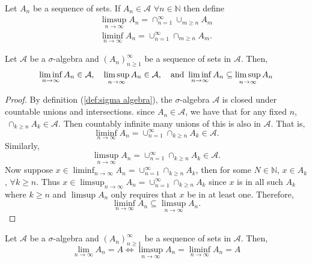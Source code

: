 \documentclass[../main.tex]{subfiles}
\begin{document}
\begin{definition}\label{def:sup and inf of sequence of sets}
Let $A_n$ be a sequence of sets. If $A_n \in \mathcal{A}$ $\forall n \in \mathbb{N}$ then define
\begin{gather*}
\limsup_{n\to\infty}{A_n} = \cap^\infty_{n=1}\cup_{m \geq n}{A_m}\\
\liminf_{n\to\infty}{A_n} = \cup^\infty_{n=1}\cap_{m\geq n}{A_m}.
\end{gather*}

\end{definition}


\begin{lemma}\label{lem:inf subset of sup}
Let $\mathcal{A}$ be a $\sigma$-algebra and $(A_n)^\infty_{n\geq 1}$ be a sequence 
of sets in $\mathcal{A}$. Then, \[
\liminf_{n\to\infty}{A_n} \in \mathcal{A}, \quad \limsup_{n\to\infty}{A_n} \in \mathcal{A}, \quad \textnormal{and } \liminf_{n\to\infty}{A_n} \subseteq \limsup_{n\to\infty}{A_n}
\]
\end{lemma}

\begin{proof}
By definition (\ref{def:sigma algebra}), the $\sigma$-algebra $\mathcal{A}$
is closed under countable unions and intersections. since $A_n \in \mathcal{A}$, we have that 
for any fixed $n$, $ \ \cap_{k\geq n}{A_k} \in \mathcal{A}$. Then
countably infinite many unions of this is also in $\mathcal{A}$. That is, \[
\liminf_{n\to\infty}{A_n} = \cup^\infty_{n=1}\cap_{k\geq n}{A_k} \in \mathcal{A}.
\]
Similarly, \[
    \limsup_{n\to\infty}{A_n} = \cup^\infty_{n=1}\cap_{k\geq n}{A_k} \in \mathcal{A}.
\]
Now suppose $x \in \liminf_{n\to\infty}{A_n} = \cup^\infty_{n=1}\cap_{k\geq n}{A_k}$, then for some
$N \in \mathbb{N}$, $x \in A_k$, $\forall k \geq n$. Thus $x \in \limsup_{n\to\infty}{A_n} = \cup^\infty_{n=1}\cap_{k\geq n}{A_k}$ since
$x$ is in all such $A_k$ where $k \geq n$ and $\limsup{A_n}$ only requires that $x$ be in at least one. Therefore,
\[
\liminf_{n\to\infty}{A_n} \subseteq \limsup_{n\to\infty}{A_n}.
\]
\end{proof}




\begin{lemma}\label{lem:sup equal inf mean converge}
Let $\mathcal{A}$ be a $\sigma$-algebra and $(A_n)^\infty_{n\geq 1}$ be a sequence 
of sets in $\mathcal{A}$. Then, \[
\lim_{n\to\infty}{A_n}=A \iff \limsup_{n\to\infty}{A_n} = \liminf_{n\to\infty}{A_n} = A
\]
\end{lemma}
\end{document}
